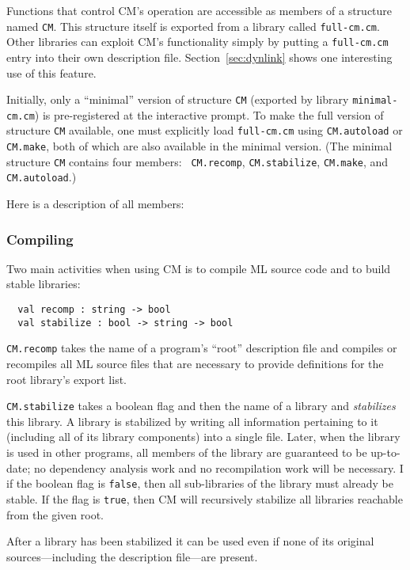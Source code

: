\documentclass{article}
\begin{document}
Functions that control CM's operation are accessible as members of a
structure named {\tt CM}.  This structure itself is exported from a
library called {\tt full-cm.cm}.  Other libraries can exploit CM's
functionality simply by putting a {\tt full-cm.cm} entry into their
own description file.  Section~\ref{sec:dynlink} shows one
interesting use of this feature.

Initially, only a ``minimal'' version of structure {\tt CM} (exported
by library {\tt minimal-cm.cm}) is pre-registered at the interactive
prompt.  To make the full version of structure {\tt CM} available, one
must explicitly load {\tt full-cm.cm} using {\tt CM.autoload} or {\tt
CM.make}, both of which are also available in the minimal version.
(The minimal structure {\tt CM} contains four members: {\tt
CM.recomp}, {\tt CM.stabilize}, {\tt CM.make}, and {\tt CM.autoload}.)

Here is a description of all members:

\subsubsection*{Compiling}

Two main activities when using CM is to compile ML source code and to
build stable libraries:

\begin{verbatim}
  val recomp : string -> bool
  val stabilize : bool -> string -> bool
\end{verbatim}

{\tt CM.recomp} takes the name of a program's ``root'' description
file and compiles or recompiles all ML source files that are necessary
to provide definitions for the root library's export list.

{\tt CM.stabilize} takes a boolean flag and then the name of a library
and {\em stabilizes} this library.  A library is stabilized by writing
all information pertaining to it (including all of its library
components) into a single file.  Later, when the library is used in
other programs, all members of the library are guaranteed to be
up-to-date; no dependency analysis work and no recompilation work will
be necessary.  I if the boolean flag is {\tt false}, then all
sub-libraries of the library must already be stable.  If the flag is
{\tt true}, then CM will recursively stabilize all libraries reachable
from the given root.

After a library has been stabilized it can be used even if none of its
original sources---including the description file---are present.
\end{document}
